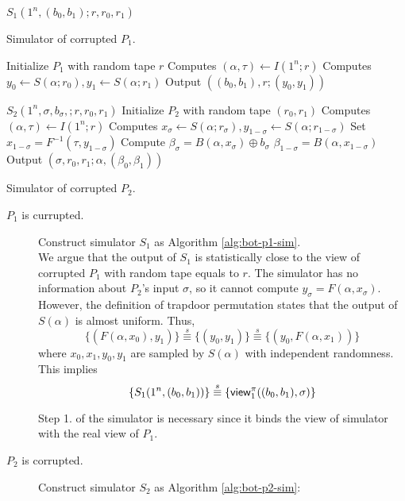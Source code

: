 \begin{algorithm}
$S_1(1^n,(b_0,b_1);r,r_0,r_1)$\;
\caption{Simulator of corrupted $P_1$.} \label{alg:bot-p1-sim}
Initialize $P_1$ with random tape $r$\;
Computes $(\alpha,\tau)\gets I(1^n;r)$\;
Computes $y_0\gets S(\alpha;r_0), y_1\gets S(\alpha;r_1)$\;
Output $((b_0,b_1),r;(y_0,y_1))$\;
\end{algorithm}

\begin{algorithm}
$S_2(1^n,\sigma,b_\sigma,;r,r_0,r_1)$\;
Initialize $P_2$ with random tape $(r_0,r_1)$\;
Computes $(\alpha,\tau)\gets I(1^n;r)$\;
Computes $x_\sigma\gets S(\alpha;r_\sigma), y_{1-\sigma}\gets S(\alpha;r_{1-\sigma})$\;
Set $x_{1-\sigma}=F^{-1}(\tau,y_{1-\sigma})$\;
Compute $\beta_\sigma=B(\alpha,x_\sigma)\oplus b_\sigma$\;
$\beta_{1-\sigma}=B(\alpha,x_{1-\sigma})$\;
Output $(\sigma,r_0,r_1;\alpha,(\beta_0,\beta_1))$\;

\caption{Simulator of corrupted $P_2$.} \label{alg:bot-p2-sim}
\end{algorithm}

\begin{description}
\item[$P_1$ is currupted.] Construct simulator $S_1$ as Algorithm \ref{alg:bot-p1-sim}. \\
We argue that the output of $S_1$ is statistically close to the view of corrupted $P_1$ with random tape equals to $r$. The simulator has no information about $P_2$'s input $\sigma$, so it cannot compute $y_\sigma=F(\alpha,x_\sigma)$. However, the definition of trapdoor permutation states that the output of $S(\alpha)$ is almost uniform. Thus,
    $$\{(F(\alpha,x_0),y_1)\}\stackrel{s}{\equiv}\{(y_0,y_1)\}\stackrel{s}{\equiv}\{(y_0,F(\alpha,x_1))\}$$
where $x_0,x_1,y_0,y_1$ are sampled by $S(\alpha)$ with independent randomness. This implies
$$\{S_1(1^n,(b_0,b_1))\}\stackrel{s}{\equiv}\{{\sf view}^\pi_1((b_0,b_1),\sigma)\}$$
\begin{remark}
Step 1. of the simulator is necessary since it binds the view of simulator with the real view of $P_1$.
\end{remark}
\item[$P_2$ is corrupted.] Construct simulator $S_2$ as Algorithm \ref{alg:bot-p2-sim}:

\end{description}

